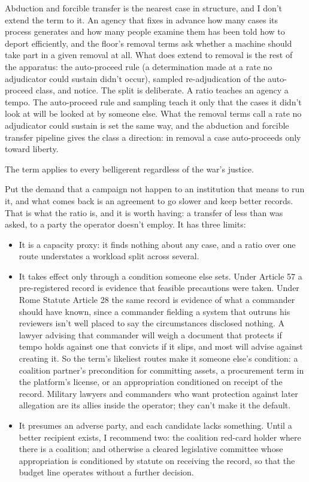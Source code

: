 Abduction and forcible transfer is the nearest case in structure, and I don't extend the term to it. An agency that fixes in advance how many cases its process generates and how many people examine them has been told how to deport efficiently, and the floor's removal terms ask whether a machine should take part in a given removal at all. What does extend to removal is the rest of the apparatus: the auto-proceed rule (a determination made at a rate no adjudicator could sustain didn't occur), sampled re-adjudication of the auto-proceed class, and notice. The split is deliberate. A ratio teaches an agency a tempo. The auto-proceed rule and sampling teach it only that the cases it didn't look at will be looked at by someone else. What the removal terms call a rate no adjudicator could sustain is set the same way, and the abduction and forcible transfer pipeline gives the class a direction: in removal a case auto-proceeds only toward liberty.

The term applies to every belligerent regardless of the war's justice.

Put the demand that a campaign not happen to an institution that means to run it, and what comes back is an agreement to go slower and keep better records. That is what the ratio is, and it is worth having: a transfer of less than was asked, to a party the operator doesn't employ. It has three limits:

\begin{itemize}
\item It is a capacity proxy: it finds nothing about any case, and a ratio over one route understates a workload split across several.
\item It takes effect only through a condition someone else sets. Under Article 57 a pre-registered record is evidence that feasible precautions were taken. Under Rome Statute Article 28 the same record is evidence of what a commander should have known, since a commander fielding a system that outruns his reviewers isn't well placed to say the circumstances disclosed nothing. A lawyer advising that commander will weigh a document that protects if tempo holds against one that convicts if it slips, and most will advise against creating it. So the term's likeliest routes make it someone else's condition: a coalition partner's precondition for committing assets, a procurement term in the platform's license, or an appropriation conditioned on receipt of the record. Military lawyers and commanders who want protection against later allegation are its allies inside the operator; they can't make it the default.
\item It presumes an adverse party, and each candidate lacks something. Until a better recipient exists, I recommend two: the coalition red-card holder where there is a coalition; and otherwise a cleared legislative committee whose appropriation is conditioned by statute on receiving the record, so that the budget line operates without a further decision.
\end{itemize}

